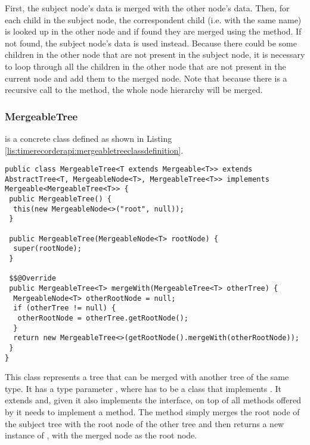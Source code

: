 \noindent First, the subject node's data is merged with the other node's data. Then, for each child in the subject node, the correspondent child (i.e. with the same name) is looked up in the other node and if found they are merged using the  method. If not found, the subject node's data is used instead. Because there could be some children in the other node that are not present in the subject node, it is necessary to loop through all the children in the other node that are not present in the current node and add them to the merged node. Note that because there is a recursive call to the  method, the whole node hierarchy will be merged.

\subsubsection{MergeableTree}

 is a concrete class defined as shown in Listing \ref{lis:timerecorderapi:mergeabletreeclassdefinition}.

\begin{lstlisting}[breaklines,caption={MergeableTree class definition},label=lis:timerecorderapi:mergeabletreeclassdefinition]
public class MergeableTree<T extends Mergeable<T>> extends AbstractTree<T, MergeableNode<T>, MergeableTree<T>> implements Mergeable<MergeableTree<T>> {
 public MergeableTree() {
  this(new MergeableNode<>("root", null));
 }

 public MergeableTree(MergeableNode<T> rootNode) {
  super(rootNode);
 }

 $$@Override
 public MergeableTree<T> mergeWith(MergeableTree<T> otherTree) {
  MergeableNode<T> otherRootNode = null;
  if (otherTree != null) {
   otherRootNode = otherTree.getRootNode();
  }
  return new MergeableTree<>(getRootNode().mergeWith(otherRootNode));
 }
}
\end{lstlisting}

\noindent This class represents a tree that can be merged with another tree of the same type. It has a type parameter , where  has to be a class that implements . It extends  and, given it also implements the  interface, on top of all methods offered by  it needs to implement a  method. The  method simply merges the root node of the subject tree with the root node of the other tree and then returns a new instance of , with the merged node as the root node.


